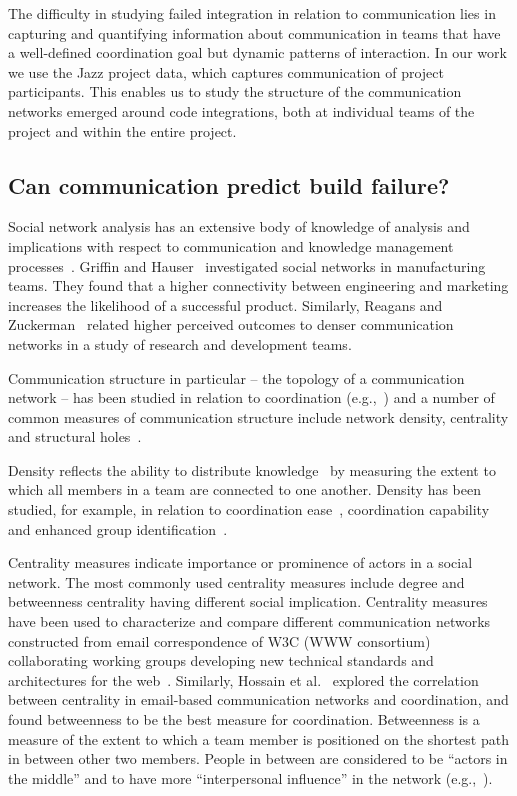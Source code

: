 The difficulty in studying failed integration in relation to communication lies
in capturing and quantifying information about communication in teams that have a
well-defined coordination goal but dynamic patterns of interaction. In our work
we use the Jazz project data, which captures communication of project
participants. This enables us to study the structure of the communication
networks emerged around code integrations, both at individual teams of the
project and within the entire project.

\subsection{Can communication predict build failure?}
\label{sec:ResearchQuestions}
Social network analysis has an extensive body of knowledge of analysis and implications with respect to communication and knowledge management
processes~\cite{Burt:1995vo,Freeman:1979rl}. Griffin and
Hauser~\cite{Griffin:1992ms} investigated social networks in manufacturing teams.
They found that a higher connectivity between engineering and marketing increases
the likelihood of a successful product. Similarly, Reagans and
Zuckerman~\cite{RayReagans:2001os} related higher perceived outcomes to denser
communication networks in a study of research and development teams.

Communication structure in particular -- the topology of a communication network
-- has been studied in relation to coordination
(e.g.,~\cite{hossain:cscw:2006,hinds:cscw:2006}) and a number of common measures of
communication structure include network density, centrality and structural
holes~\cite{Wasserman:1994sq,Freeman:1979rl}.

Density reflects the ability to distribute knowledge~\cite{Rulke:2000ys} by measuring the extent to which all members in a team are connected to one another. 
Density has been studied, for example, in relation
to coordination ease~\cite{hinds:cscw:2006}, coordination
capability~\cite{hossain:cscw:2006} and enhanced group
identification~\cite{RayReagans:2001os}.

Centrality measures indicate importance or prominence of actors in a
social network. The most commonly used centrality measures include degree and
betweenness centrality having different social implication. Centrality measures
have been used to characterize and compare different communication networks
constructed from email correspondence of W3C (WWW consortium) collaborating
working groups developing new technical standards and architectures for the
web~\cite{Gloor:2003cikm}. Similarly, Hossain et al.~\cite{hossain:cscw:2006}
explored the correlation between centrality in email-based communication networks
and coordination, and found betweenness to be the best measure for coordination.
Betweenness is a measure of the extent to which a team member is
positioned on the shortest path in between other two members. People in between
are considered to be ``actors in the middle'' and to have more ``interpersonal
influence'' in the
network (e.g.,~\cite{Gloor:2003cikm,zimmermann:icse:2008,hossain:cscw:2006}).

